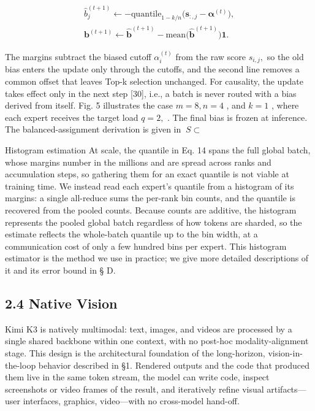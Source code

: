 \documentclass[
  10
]{article}
\begin{document}
\[
\begin{array}{l} \widehat {b} _ {j} ^ {(t + 1)} \leftarrow - \text {quantile} _ {1 - k / n} \Big (\boldsymbol {s} _ {:, j} - \boldsymbol {\alpha} ^ {(t)} \Big), \\ \boldsymbol {b} ^ {(t + 1)} \leftarrow \widehat {\boldsymbol {b}} ^ {(t + 1)} - \text {mean} \Big (\widehat {\boldsymbol {b}} ^ {(t + 1)} \Big)   \mathbf {1}. \end{array}\tag{14}
\]

The margins subtract the biased cutoff \(\alpha _ { i } ^ { ( t ) }\)
from the raw score \(s _ { i , j } ,\) so the old bias enters the update
only through the cutoffs, and the second line removes a common offset
that leaves Top-k selection unchanged. For causality, the update takes
effect only in the next step {[}30{]}, i.e., a batch is never routed
with a bias derived from itself. Fig. 5 illustrates the case
\(m = 8 , n = 4\) , and \(k = 1\) , where each expert receives the
target load \(q = 2 ,\) . The final bias is frozen at inference. The
balanced-assignment derivation is given in \(\ S \subset\)

Histogram estimation At scale, the quantile in Eq. 14 spans the full
global batch, whose margins number in the millions and are spread across
ranks and accumulation steps, so gathering them for an exact quantile is
not viable at training time. We instead read each expert's quantile from
a histogram of its margins: a single all-reduce sums the per-rank bin
counts, and the quantile is recovered from the pooled counts. Because
counts are additive, the histogram represents the pooled global batch
regardless of how tokens are sharded, so the estimate reflects the
whole-batch quantile up to the bin width, at a communication cost of
only a few hundred bins per expert. This histogram estimator is the
method we use in practice; we give more detailed descriptions of it and
its error bound in § D.

\subsection{2.4 Native Vision}\label{native-vision}

Kimi K3 is natively multimodal: text, images, and videos are processed
by a single shared backbone within one context, with no post-hoc
modality-alignment stage. This design is the architectural foundation of
the long-horizon, vision-in-the-loop behavior described in §1. Rendered
outputs and the code that produced them live in the same token stream,
the model can write code, inspect screenshots or video frames of the
result, and iteratively refine visual artifacts---user interfaces,
graphics, video---with no cross-model hand-off.
\end{document}

